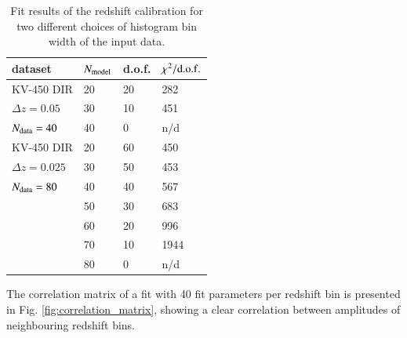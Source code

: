 \documentclass{aa}
\begin{document}
\begin{table}
\label{tab:redshift_calibration}
\begin{tabular}{llll}
\hline
dataset & $N_{\rm model}$ & d.o.f. & $\chi^2/{\rm d.o.f.}$\\
\hline
KV-450 DIR&20&20&282\\
$\Delta z = 0.05$&30&10&451\\
$N_{\rm data} = 40$&40&0&n/d\\
\hline
KV-450 DIR&20&60&450\\
$\Delta z = 0.025$&30&50&453\\
$N_{\rm data} = 80$&40&40&567\\
&50&30&683\\
&60&20&996\\
&70&10&1944\\
&80&0&n/d\\
\hline
\end{tabular}
\caption{Fit results of the redshift calibration for two different choices of histogram bin width of the input data. }
\end{table}
The correlation matrix of a fit with 40 fit parameters per redshift bin is presented in Fig. \ref{fig:correlation_matrix}, showing a clear correlation between amplitudes of neighbouring redshift bins.  
\end{document}
